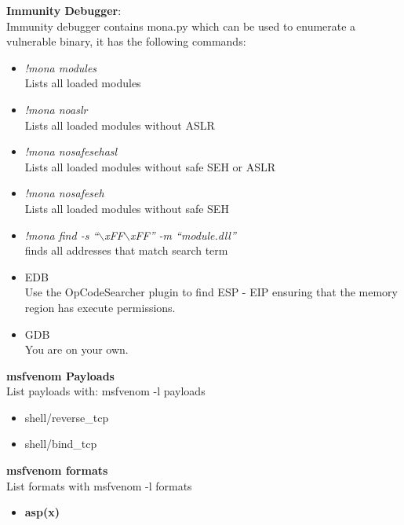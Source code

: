\documentclass[a4paper,10pt]{article}
\begin{document}
\begin{multicols}{2}
\begin{tcolorbox}[breakable,title=Windows Debugging Tools]
\textbf{Immunity Debugger}:\\
Immunity debugger contains mona.py which can be used to enumerate a vulnerable binary, it has the following commands:\\
\begin{itemize}
	\itemsep0em
	\item \textit{!mona modules}\\Lists all loaded modules
	\item\textit{!mona noaslr}\\Lists all loaded modules without ASLR
	\item\textit{!mona nosafesehasl}\\Lists all loaded modules without safe SEH or ASLR
	\item\textit{!mona nosafeseh}\\Lists all loaded modules without safe SEH
	\item\textit{!mona find -s ``$\backslash$xFF$\backslash$xFF'' -m ``module.dll''}\\ finds all addresses that match search term
\end{itemize}
\end{tcolorbox}
\begin{tcolorbox}[breakable,title=Linux Debugging Tools]
\begin{itemize}
	\itemsep0em 
	\item EDB\\Use the OpCodeSearcher plugin to find ESP - EIP ensuring that the memory region has execute permissions.
	\item GDB\\ You are on your own.
\end{itemize}
\end{tcolorbox}
\begin{tcolorbox}[breakable,title=Payload Generation]
\textbf{msfvenom Payloads}\\
List payloads with: msfvenom -l payloads
\begin{itemize}
	\itemsep0em
	\item shell/reverse\_tcp
	\item shell/bind\_tcp
\end{itemize}
\textbf{msfvenom formats}\\List formats with msfvenom -l formats
\begin{itemize}
	\itemsep0em
	\item \textbf{asp(x)}

\end{itemize}
\end{tcolorbox}
\end{multicols}
\end{document}
